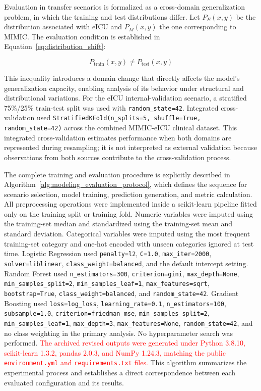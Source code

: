 \documentclass[utf8]{FrontiersinHarvard} %
\begin{document}
Evaluation in transfer scenarios is formalized as a cross-domain generalization problem, in which the training and test distributions differ. Let $P_E(x, y)$ be the distribution associated with eICU and $P_M(x, y)$ the one corresponding to MIMIC. The evaluation condition is established in Equation~\ref{eq:distribution_shift}:

\begin{equation}
	P_{\text{train}}(x, y) \neq P_{\text{test}}(x, y)
	\label{eq:distribution_shift}
\end{equation}

This inequality introduces a domain change that directly affects the model's generalization capacity, enabling analysis of its behavior under structural and distributional variations. For the eICU internal-validation scenario, a stratified 75\%/25\% train-test split was used with \texttt{random\_state=42}. Integrated cross-validation used \texttt{StratifiedKFold(n\_splits=5, shuffle=True, random\_state=42)} across the combined MIMIC-eICU clinical dataset. This integrated cross-validation estimates performance when both domains are represented during resampling; it is not interpreted as external validation because observations from both sources contribute to the cross-validation process.

The complete training and evaluation procedure is explicitly described in Algorithm~\ref{alg:modeling_evaluation_protocol}, which defines the sequence for scenario selection, model training, prediction generation, and metric calculation. All preprocessing operations were implemented inside a scikit-learn pipeline fitted only on the training split or training fold. Numeric variables were imputed using the training-set median and standardized using the training-set mean and standard deviation. Categorical variables were imputed using the most frequent training-set category and one-hot encoded with unseen categories ignored at test time. Logistic Regression used \texttt{penalty=l2}, \texttt{C=1.0}, \texttt{max\_iter=2000}, \texttt{solver=liblinear}, \texttt{class\_weight=balanced}, and the default intercept setting. Random Forest used \texttt{n\_estimators=300}, \texttt{criterion=gini}, \texttt{max\_depth=None}, \texttt{min\_samples\_split=2}, \texttt{min\_samples\_leaf=1}, \texttt{max\_features=sqrt}, \texttt{bootstrap=True}, \texttt{class\_weight=balanced}, and \texttt{random\_state=42}. Gradient Boosting used \texttt{loss=log\_loss}, \texttt{learning\_rate=0.1}, \texttt{n\_estimators=100}, \texttt{subsample=1.0}, \texttt{criterion=friedman\_mse}, \texttt{min\_samples\_split=2}, \texttt{min\_samples\_leaf=1}, \texttt{max\_depth=3}, \texttt{max\_features=None}, \texttt{random\_state=42}, and no class weighting in the primary analysis. No hyperparameter search was performed. \textcolor{red}{The archived revised outputs were generated under Python 3.8.10, scikit-learn 1.3.2, pandas 2.0.3, and NumPy 1.24.3, matching the public \texttt{environment.yml} and \texttt{requirements.txt} files.} This algorithm summarizes the experimental process and establishes a direct correspondence between each evaluated configuration and its results.
\end{document}

